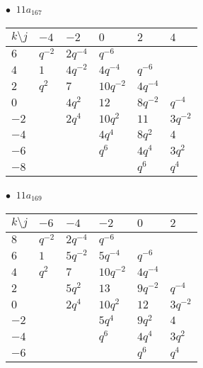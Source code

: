 \begin{minipage}{\linewidth}
$\bullet\ $ $11a_{167}$ \vspace{0.5em} \\
\begin{tabular}{l|lllll}
$k \setminus j$ & $-4$ & $-2$ & $0$ & $2$ & $4$ \\
\hline
$6$ & $q^{-2}$ & $2q^{-4}$ & $q^{-6}$ &  &  \\
$4$ & $1$ & $4q^{-2}$ & $4q^{-4}$ & $q^{-6}$ &  \\
$2$ & $q^{2}$ & $7$ & $10q^{-2}$ & $4q^{-4}$ &  \\
$0$ &  & $4q^{2}$ & $12$ & $8q^{-2}$ & $q^{-4}$ \\
$-2$ &  & $2q^{4}$ & $10q^{2}$ & $11$ & $3q^{-2}$ \\
$-4$ &  &  & $4q^{4}$ & $8q^{2}$ & $4$ \\
$-6$ &  &  & $q^{6}$ & $4q^{4}$ & $3q^{2}$ \\
$-8$ &  &  &  & $q^{6}$ & $q^{4}$ \\
\end{tabular}
\vspace{2em}
\end{minipage}
%
\begin{minipage}{\linewidth}
$\bullet\ $ $11a_{169}$ \vspace{0.5em} \\
\begin{tabular}{l|lllll}
$k \setminus j$ & $-6$ & $-4$ & $-2$ & $0$ & $2$ \\
\hline
$8$ & $q^{-2}$ & $2q^{-4}$ & $q^{-6}$ &  &  \\
$6$ & $1$ & $5q^{-2}$ & $5q^{-4}$ & $q^{-6}$ &  \\
$4$ & $q^{2}$ & $7$ & $10q^{-2}$ & $4q^{-4}$ &  \\
$2$ &  & $5q^{2}$ & $13$ & $9q^{-2}$ & $q^{-4}$ \\
$0$ &  & $2q^{4}$ & $10q^{2}$ & $12$ & $3q^{-2}$ \\
$-2$ &  &  & $5q^{4}$ & $9q^{2}$ & $4$ \\
$-4$ &  &  & $q^{6}$ & $4q^{4}$ & $3q^{2}$ \\
$-6$ &  &  &  & $q^{6}$ & $q^{4}$ \\
\end{tabular}
\vspace{2em}
\end{minipage}
%
